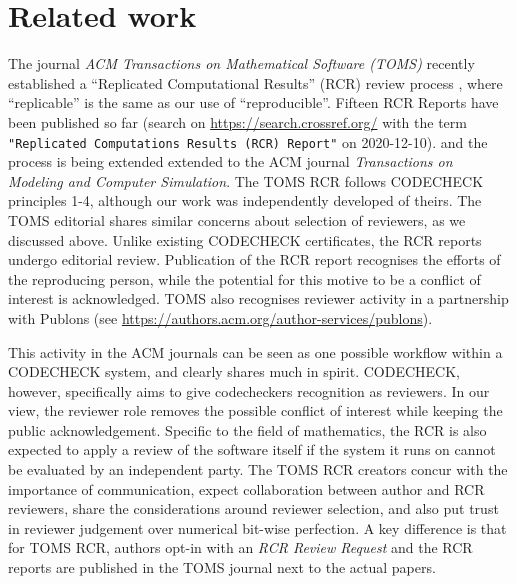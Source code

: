 \documentclass[12pt]{article}
\begin{document}
\section*{Related work}\label{related-work}

The journal \emph{ACM Transactions on Mathematical Software (TOMS)}
recently established a ``Replicated Computational Results'' (RCR)
review process \cite{heroux_editorial_2015}, where ``replicable'' is
the same as our use of ``reproducible''.  Fifteen RCR Reports have
been published so far (search on \url{https://search.crossref.org/}
with the term \texttt{"Replicated Computations Results (RCR) Report"}
on 2020-12-10).
and the process is being extended extended to the ACM journal
\emph{Transactions on Modeling and Computer Simulation}.
The TOMS RCR follows CODECHECK principles 1-4, although our work was
independently developed of theirs.  The TOMS editorial
\cite{heroux_editorial_2015} shares similar concerns about selection
of reviewers, as we discussed above. Unlike existing CODECHECK
certificates, the RCR reports undergo editorial review.  Publication
of the RCR report recognises the efforts of the reproducing person,
while the potential for this motive to be a conflict of interest is
acknowledged.  TOMS also recognises reviewer activity in a partnership
with Publons (see
\url{https://authors.acm.org/author-services/publons}).

This activity in the ACM journals can be seen as one possible workflow
within a CODECHECK system, and clearly shares much in spirit.
CODECHECK, however, specifically aims to give codecheckers recognition
as reviewers.  In our view, the reviewer role removes the possible
conflict of interest while keeping the public acknowledgement.
Specific to the field of mathematics, the RCR is also expected to
apply a review of the software itself if the system it runs on cannot
be evaluated by an independent party.  The TOMS RCR creators concur
with the importance of communication, expect collaboration between
author and RCR reviewers, share the considerations around reviewer
selection, and also put trust in reviewer judgement over numerical
bit-wise perfection.  A key difference is that for TOMS RCR, authors
opt-in with an \emph{RCR Review Request} and the RCR reports are
published in the TOMS journal next to the actual papers.
\end{document}
